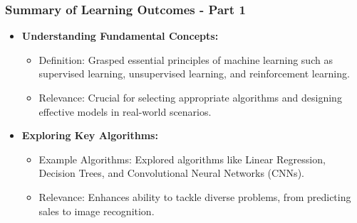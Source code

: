 \documentclass[aspectratio=169]{beamer}
\begin{document}
\begin{frame}
    \frametitle{Summary of Learning Outcomes - Part 1}
    \begin{itemize}
        \item \textbf{Understanding Fundamental Concepts:}
            \begin{itemize}
                \item Definition: Grasped essential principles of machine learning such as supervised learning, unsupervised learning, and reinforcement learning.
                \item Relevance: Crucial for selecting appropriate algorithms and designing effective models in real-world scenarios.
            \end{itemize}
        
        \item \textbf{Exploring Key Algorithms:}
            \begin{itemize}
                \item Example Algorithms: Explored algorithms like Linear Regression, Decision Trees, and Convolutional Neural Networks (CNNs).
                \item Relevance: Enhances ability to tackle diverse problems, from predicting sales to image recognition.
            \end{itemize}
    \end{itemize}
\end{frame}
\end{document}
